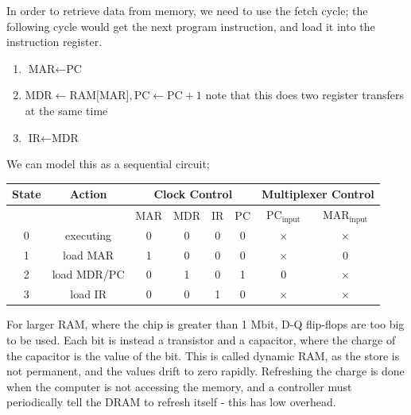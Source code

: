 \documentclass[a4paper, 12pt]{article}
\begin{document}
            In order to retrieve data from memory, we need to use the fetch cycle; the following cycle would get the next program instruction, and load it into the instruction register.
            \begin{enumerate}[1.]
                \itemsep0em
                \item $\text{MAR} \leftarrow \text{PC}$
                \item $\text{MDR} \leftarrow \text{RAM[MAR]}, \text{PC} \leftarrow \text{PC} + 1$
                    \subitem note that this does two register transfers at the same time
                \item $\text{IR} \leftarrow \text{MDR}$
            \end{enumerate}
            We can model this as a sequential circuit;
            \begin{center}
                \begin{tabular}{c|c||c|c|c|c||c|c}
                    State & Action & \multicolumn{4}{c||}{Clock Control} & \multicolumn{2}{c}{Multiplexer Control} \\
                    \hline
                    \multicolumn{2}{c||}{\ } & MAR & MDR & IR & PC & $\text{PC}_\text{input}$ & $\text{MAR}_\text{input}$ \\
                    \hline
                    0 & executing & 0 & 0 & 0 & 0 & $\times$ & $\times$ \\
                    1 & load MAR & 1 & 0 & 0 & 0 & $\times$ & 0 \\
                    2 & load MDR/PC & 0 & 1 & 0 & 1 & 0 & $\times$ \\
                    3 & load IR & 0 & 0 & 1 & 0 & $\times$ & $\times$ \\
                \end{tabular}
                \bigskip

            \end{center}
            For larger RAM, where the chip is greater than 1 Mbit, D-Q flip-flops are too big to be used. Each bit is instead a transistor and a capacitor, where the charge of the capacitor is the value of the bit. This is called dynamic RAM, as the store is not permanent, and the values drift to zero rapidly. Refreshing the charge is done when the computer is not accessing the memory, and a controller must periodically tell the DRAM to refresh itself - this has low overhead.
\end{document}

